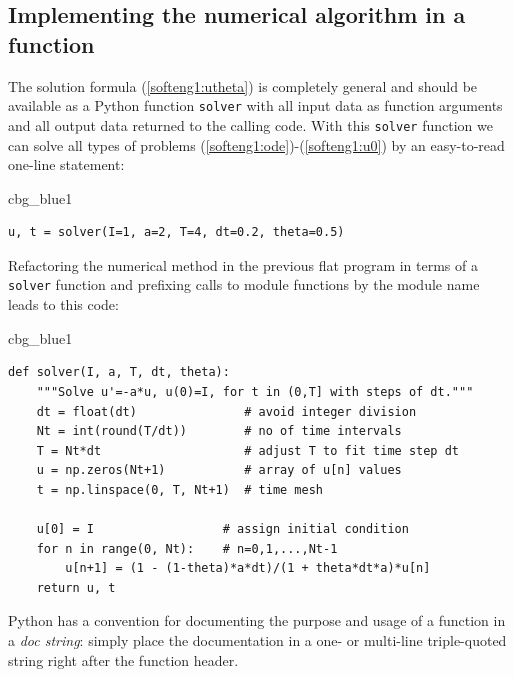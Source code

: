 \documentclass[%
oneside,                 %
final,                   %
10pt]{article}
\newenvironment{_cod_tight}[1]{
   \def\FrameCommand{\colorbox{#1}}
   \FrameRule0.6pt\MakeFramed {\FrameRestore}\vskip3mm}
   {\vskip0mm\endMakeFramed}
\newenvironment{cod}[1]{
\bgroup\rmfamily
\fboxsep=0mm\relax
\begin{_cod_tight}{#1}
\list{}{\parsep=-2mm\parskip=0mm\topsep=0pt\leftmargin=2mm
\rightmargin=2\leftmargin\leftmargin=4pt\relax}
\item\relax}
{\endlist\end{_cod_tight}\egroup}
\newenvironment{notice_mdfboxadmon}[1][]{
\begin{notice_mdfboxmdframed}[frametitle=#1]
}
{
\end{notice_mdfboxmdframed}
}
\begin{document}
\subsection{Implementing the numerical algorithm in a function}
\label{softeng1:basic:func}

The solution formula (\ref{softeng1:utheta}) is completely general and
should be available as a Python function \texttt{solver} with all input data as
function arguments and all output data returned to the calling code.
With this \texttt{solver} function we can solve all types of problems
(\ref{softeng1:ode})-(\ref{softeng1:u0})
by an easy-to-read one-line statement:

\begin{cod}{cbg_blue1}\begin{Verbatim}[numbers=none,fontsize=\fontsize{9pt}{9pt},baselinestretch=0.95,xleftmargin=2mm]
u, t = solver(I=1, a=2, T=4, dt=0.2, theta=0.5)
\end{Verbatim}
\end{cod}
\noindent

Refactoring the numerical method in the previous flat program
in terms of a \texttt{solver} function and prefixing calls to
module functions by the module name leads to this code:

\begin{cod}{cbg_blue1}\begin{Verbatim}[numbers=none,fontsize=\fontsize{9pt}{9pt},baselinestretch=0.95,xleftmargin=2mm]
def solver(I, a, T, dt, theta):
    """Solve u'=-a*u, u(0)=I, for t in (0,T] with steps of dt."""
    dt = float(dt)               # avoid integer division
    Nt = int(round(T/dt))        # no of time intervals
    T = Nt*dt                    # adjust T to fit time step dt
    u = np.zeros(Nt+1)           # array of u[n] values
    t = np.linspace(0, T, Nt+1)  # time mesh

    u[0] = I                  # assign initial condition
    for n in range(0, Nt):    # n=0,1,...,Nt-1
        u[n+1] = (1 - (1-theta)*a*dt)/(1 + theta*dt*a)*u[n]
    return u, t
\end{Verbatim}
\end{cod}
\noindent


\begin{notice_mdfboxadmon}
Python has a convention for documenting the purpose and usage of
a function in a \emph{doc string}: simply place the documentation
in a one- or multi-line triple-quoted string right after the
function header.
\end{notice_mdfboxadmon}
\end{document}
